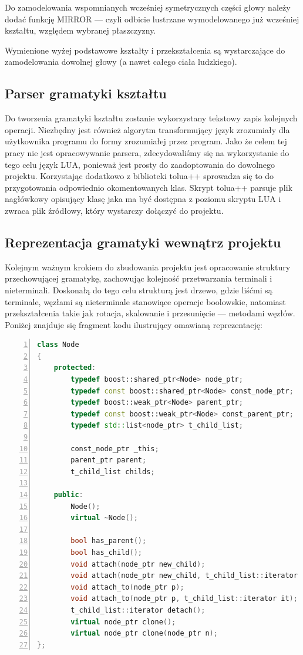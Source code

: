 Do zamodelowania wspomnianych wcześniej symetrycznych części głowy należy dodać
funkcję MIRROR --- czyli odbicie lustrzane wymodelowanego już wcześniej
kształtu, względem wybranej płaszczyzny.

Wymienione wyżej podstawowe kształty i przekształcenia są wystarczające do
zamodelowania dowolnej głowy (a nawet całego ciała ludzkiego).

\subsection{Parser gramatyki kształtu}
Do tworzenia gramatyki kształtu zostanie wykorzystany tekstowy zapis kolejnych
operacji. Niezbędny jest również algorytm transformujący język zrozumiały dla
użytkownika programu do formy zrozumiałej przez program. Jako że celem tej pracy
nie jest opracowywanie parsera, zdecydowaliśmy się na wykorzystanie do tego celu
język LUA, ponieważ jest prosty do zaadoptowania do dowolnego projektu.
Korzystając dodatkowo z biblioteki tolua++ sprowadza się to do przygotowania
odpowiednio okomentowanych klas. Skrypt tolua++ parsuje plik nagłówkowy
opisujący klasę jaka ma być dostępna z poziomu skryptu LUA i zwraca plik
źródłowy, który wystarczy dołączyć do projektu.

\subsection{Reprezentacja gramatyki wewnątrz projektu}
Kolejnym ważnym krokiem do zbudowania projektu jest opracowanie struktury
przechowującej gramatykę, zachowując kolejność przetwarzania terminali i
nieterminali. Doskonałą do tego celu strukturą jest drzewo, gdzie liśćmi są
terminale, węzłami są nieterminale stanowiące operacje boolowskie, natomiast
przekształcenia takie jak rotacja, skalowanie i przesunięcie --- metodami
węzłów. Poniżej znajduje się fragment kodu ilustrujący omawianą reprezentację:

{
\small
\begin{lstlisting}[language=C++,numbers=left,frame=single,numberstyle=\tiny,backgroundcolor=\color{code_back},breaklines=true]
class Node
{
    protected:
        typedef boost::shared_ptr<Node> node_ptr;
        typedef const boost::shared_ptr<Node> const_node_ptr;
        typedef boost::weak_ptr<Node> parent_ptr;
        typedef const boost::weak_ptr<Node> const_parent_ptr;
        typedef std::list<node_ptr> t_child_list;

        const_node_ptr _this;
        parent_ptr parent;
        t_child_list childs;

    public:
        Node();
        virtual ~Node();

        bool has_parent();
        bool has_child();
		void attach(node_ptr new_child);
		void attach(node_ptr new_child, t_child_list::iterator it);
		void attach_to(node_ptr p);
		void attach_to(node_ptr p, t_child_list::iterator it);
		t_child_list::iterator detach();
		virtual node_ptr clone();
		virtual node_ptr clone(node_ptr n);
};
\end{lstlisting}
}

